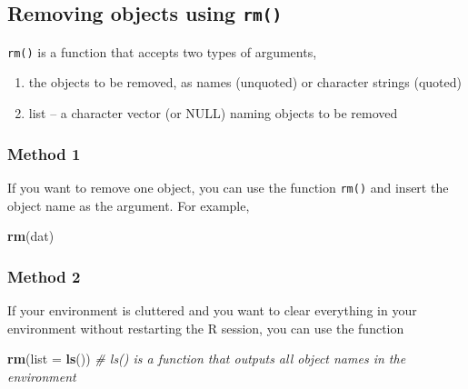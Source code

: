 \documentclass[
]{book}
\newenvironment{Shaded}{\begin{snugshade}}{\end{snugshade}}
\newcommand{\AttributeTok}[1]{\textcolor[rgb]{0.13,0.29,0.53}{#1}}
\newcommand{\CommentTok}[1]{\textcolor[rgb]{0.56,0.35,0.01}{\textit{#1}}}
\newcommand{\FunctionTok}[1]{\textcolor[rgb]{0.13,0.29,0.53}{\textbf{#1}}}
\newcommand{\NormalTok}[1]{#1}
\providecommand{\tightlist}{%
  \setlength{\itemsep}{0pt}\setlength{\parskip}{0pt}}
\begin{document}
\subsection*{\texorpdfstring{Removing objects using \texttt{rm()}}{Removing objects using rm()}}\label{removing-objects-using-rm}

\texttt{rm()} is a function that accepts two types of arguments,

\begin{enumerate}
\def\labelenumi{\arabic{enumi}.}
\tightlist
\item
  the objects to be removed, as names (unquoted) or character strings (quoted)
\item
  list -- a character vector (or NULL) naming objects to be removed
\end{enumerate}

\subsubsection*{Method 1}\label{method-1}

If you want to remove one object, you can use the function \texttt{rm()} and insert the object name as the argument. For example,

\begin{Shaded}
\begin{Highlighting}[]
\FunctionTok{rm}\NormalTok{(dat)}
\end{Highlighting}
\end{Shaded}

\subsubsection*{Method 2}\label{method-2}

If your environment is cluttered and you want to clear everything in your environment without restarting the R session, you can use the function

\begin{Shaded}
\begin{Highlighting}[]
\FunctionTok{rm}\NormalTok{(}\AttributeTok{list =} \FunctionTok{ls}\NormalTok{()) }\CommentTok{\# ls() is a function that outputs all object names in the environment}
\end{Highlighting}
\end{Shaded}
\end{document}
